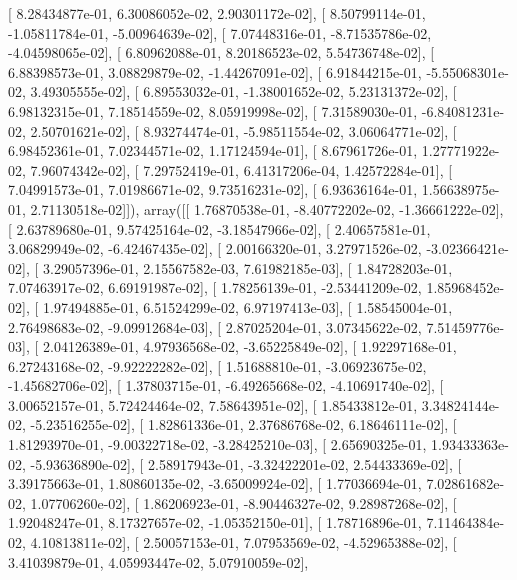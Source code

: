 \documentclass{article}
\begin{document}
       [  8.28434877e-01,   6.30086052e-02,   2.90301172e-02],
       [  8.50799114e-01,  -1.05811784e-01,  -5.00964639e-02],
       [  7.07448316e-01,  -8.71535786e-02,  -4.04598065e-02],
       [  6.80962088e-01,   8.20186523e-02,   5.54736748e-02],
       [  6.88398573e-01,   3.08829879e-02,  -1.44267091e-02],
       [  6.91844215e-01,  -5.55068301e-02,   3.49305555e-02],
       [  6.89553032e-01,  -1.38001652e-02,   5.23131372e-02],
       [  6.98132315e-01,   7.18514559e-02,   8.05919998e-02],
       [  7.31589030e-01,  -6.84081231e-02,   2.50701621e-02],
       [  8.93274474e-01,  -5.98511554e-02,   3.06064771e-02],
       [  6.98452361e-01,   7.02344571e-02,   1.17124594e-01],
       [  8.67961726e-01,   1.27771922e-02,   7.96074342e-02],
       [  7.29752419e-01,   6.41317206e-04,   1.42572284e-01],
       [  7.04991573e-01,   7.01986671e-02,   9.73516231e-02],
       [  6.93636164e-01,   1.56638975e-01,   2.71130518e-02]]), array([[  1.76870538e-01,  -8.40772202e-02,  -1.36661222e-02],
       [  2.63789680e-01,   9.57425164e-02,  -3.18547966e-02],
       [  2.40657581e-01,   3.06829949e-02,  -6.42467435e-02],
       [  2.00166320e-01,   3.27971526e-02,  -3.02366421e-02],
       [  3.29057396e-01,   2.15567582e-03,   7.61982185e-03],
       [  1.84728203e-01,   7.07463917e-02,   6.69191987e-02],
       [  1.78256139e-01,  -2.53441209e-02,   1.85968452e-02],
       [  1.97494885e-01,   6.51524299e-02,   6.97197413e-03],
       [  1.58545004e-01,   2.76498683e-02,  -9.09912684e-03],
       [  2.87025204e-01,   3.07345622e-02,   7.51459776e-03],
       [  2.04126389e-01,   4.97936568e-02,  -3.65225849e-02],
       [  1.92297168e-01,   6.27243168e-02,  -9.92222282e-02],
       [  1.51688810e-01,  -3.06923675e-02,  -1.45682706e-02],
       [  1.37803715e-01,  -6.49265668e-02,  -4.10691740e-02],
       [  3.00652157e-01,   5.72424464e-02,   7.58643951e-02],
       [  1.85433812e-01,   3.34824144e-02,  -5.23516255e-02],
       [  1.82861336e-01,   2.37686768e-02,   6.18646111e-02],
       [  1.81293970e-01,  -9.00322718e-02,  -3.28425210e-03],
       [  2.65690325e-01,   1.93433363e-02,  -5.93636890e-02],
       [  2.58917943e-01,  -3.32422201e-02,   2.54433369e-02],
       [  3.39175663e-01,   1.80860135e-02,  -3.65009924e-02],
       [  1.77036694e-01,   7.02861682e-02,   1.07706260e-02],
       [  1.86206923e-01,  -8.90446327e-02,   9.28987268e-02],
       [  1.92048247e-01,   8.17327657e-02,  -1.05352150e-01],
       [  1.78716896e-01,   7.11464384e-02,   4.10813811e-02],
       [  2.50057153e-01,   7.07953569e-02,  -4.52965388e-02],
       [  3.41039879e-01,   4.05993447e-02,   5.07910059e-02],
\end{document}
